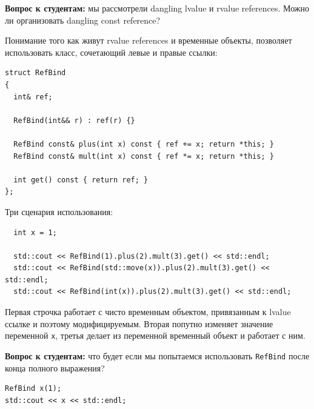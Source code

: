 \documentclass[a4paper,12pt,oneside]{article}
\newif\ifanswers
\begin{document}
\textbf{Вопрос к студентам:} мы рассмотрели dangling lvalue и rvalue references. Можно ли организовать dangling const reference?

\ifanswers
Правильный ответ: тысячей способов. Из экзотики есть способ прострелить себе ногу с помощью \lstinline!initializer_list! когда он является аргументом \lstinline!new! (пример из 12.2.5 стандарта C++14): 

\begin{lstlisting}
struct S { int mi; const pair<int,int>& mp; };
S a { 1, {2,3} }; // ok
S* p = new S{ 1, {2,3} }; // Creates dangling const reference
\end{lstlisting}

Хотя вроде \lstinline!const pair&! продлевает время жизни, но new-initializer подчиняется особым правилам.
\fi

Понимание того как живут rvalue references и временные объекты, позволяет использовать класс, сочетающий левые и правые ссылки:

\begin{lstlisting}
struct RefBind
{
  int& ref;

  RefBind(int&& r) : ref(r) {}

  RefBind const& plus(int x) const { ref += x; return *this; }
  RefBind const& mult(int x) const { ref *= x; return *this; }

  int get() const { return ref; }
};
\end{lstlisting}

Три сценария использования:

\begin{lstlisting}
  int x = 1;

  std::cout << RefBind(1).plus(2).mult(3).get() << std::endl;
  std::cout << RefBind(std::move(x)).plus(2).mult(3).get() << std::endl;
  std::cout << RefBind(int(x)).plus(2).mult(3).get() << std::endl;
\end{lstlisting}

Первая строчка работает с чисто временным объектом, привязанным к lvalue ссылке и поэтому модифицируемым. Вторая попутно изменяет значение переменной \lstinline!x!, третья делает из переменной временный объект и работает с ним.

\textbf{Вопрос к студентам:} что будет если мы попытаемся использовать \lstinline!RefBind! после конца полного выражения?

\begin{lstlisting}
RefBind x(1);
std::cout << x << std::endl;
\end{lstlisting}
\end{document}

